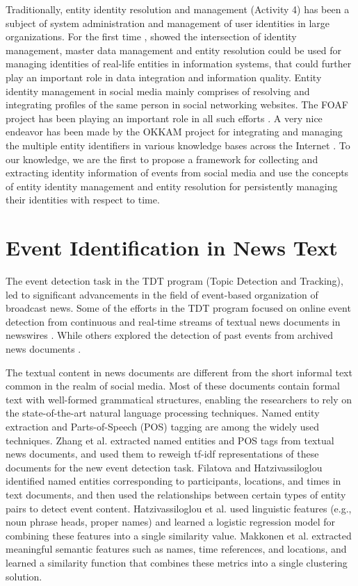 Traditionally, entity identity resolution and management (Activity 4) has been a subject of system administration and management of user identities in large organizations. For the first time \cite{zhou2011entity}, showed the intersection of identity management, master data management and entity resolution could be used for managing identities of real-life entities in information systems, that could further play an important role in data integration and information quality. Entity identity management in social media mainly comprises of resolving and integrating profiles of the same person in social networking websites. The FOAF project has been playing an important role in all such efforts \cite{bouquet2010entity,bortoli2007foaf,raad2010user}. A very nice endeavor has been made by the OKKAM project for integrating and managing the multiple entity identifiers in various knowledge bases across the Internet \cite{bouquet2006okkam}. To our knowledge, we are the first to propose a framework for collecting and extracting identity information of events from social media and use the concepts of entity identity management and entity resolution for persistently managing their identities with respect to time.


\section{Event Identification in News Text}
The event detection task \cite{allan2002topic} in the TDT program (Topic Detection and Tracking), led to significant advancements in the field of event-based organization of broadcast news. Some of the efforts in the TDT program focused on online event detection from continuous and real-time streams of textual news documents in newswires \cite{allan1998line,kumaran2004text}. While others explored the detection of past events from archived news documents \cite{yang1998study}. 

The textual content in news documents are different from the short informal text common in the realm of social media.  Most of these documents contain formal text with well-formed grammatical structures, enabling the researchers to rely on the state-of-the-art natural language processing techniques. Named entity extraction and Parts-of-Speech (POS) tagging are among the widely used techniques. Zhang et al. \cite{zhang2007new} extracted named entities and POS tags from textual news documents, and used them to reweigh tf-idf representations of these documents for the new event detection task. Filatova and Hatzivassiloglou \cite{hatzivassiloglou2003domain} identified named entities corresponding to participants, locations, and times in text documents, and then used the relationships between certain types of entity pairs to detect event content. Hatzivassiloglou et al. \cite{hatzivassiloglou2000investigation} used linguistic features (e.g., noun phrase heads, proper names) and learned a logistic regression model for combining these features into a single similarity value. Makkonen et al. \cite{makkonen2004simple} extracted meaningful semantic features such as names, time references, and locations, and learned a similarity function that combines these metrics into a single clustering solution. 

